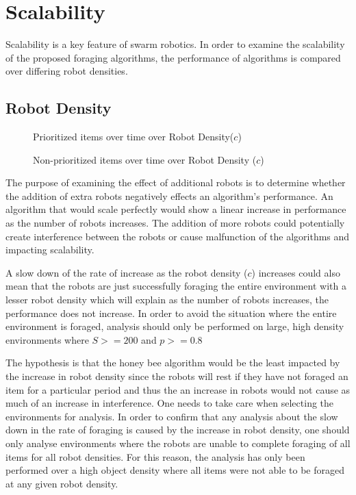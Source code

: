 \section{Scalability}
\label{results:scability}
Scalability is a key feature of swarm robotics. In order to examine the scalability of the proposed foraging algorithms, the performance of algorithms is compared over differing robot densities. 

\subsection{Robot Density}
\label{results:numberenvironments}


\begin{figure}[!htb]
\centering
\resizebox{\textwidth}{!}{}
\caption{Prioritized items over time over Robot Density($c$)}
\label{robotsgoldplot}
\end{figure}

\begin{figure}[!htb]
\centering
\resizebox{\textwidth}{!}{}
\caption{Non-prioritized items over time over Robot Density ($c$)}
\label{robotswasteplot}
\end{figure}

The purpose of examining the effect of additional robots is to determine whether the addition of extra robots negatively effects an algorithm's performance. An algorithm that would scale perfectly would show a linear increase in performance as the number of robots increases. The addition of more robots could potentially create interference between the robots or cause malfunction of the algorithms and impacting scalability. 

A slow down of the rate of increase as the robot density ($c$) increases could also mean that the robots are just successfully foraging the entire environment with a lesser robot density which will explain as the number of robots increases, the performance does not increase. In order to avoid the situation where the entire environment is foraged, analysis should only be performed on large, high density environments where $S >= 200$ and $p >= 0.8$

The hypothesis is that the honey bee algorithm would be the least impacted by the increase in robot density since the robots will rest if they have not foraged an item for a particular period and thus the an increase in robots would not cause as much of an increase in interference. One needs to take care when selecting the environments for analysis. In order to confirm that any analysis about the slow down in the rate of foraging is caused by the increase in robot density, one should only analyse environments where the robots are unable to complete foraging of all items for all robot densities. For this reason, the analysis has only been performed over a high object density where all items were not able to be foraged at any given robot density.

